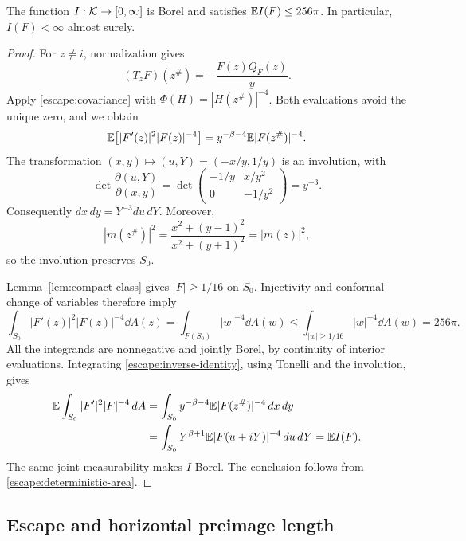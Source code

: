 \begin{lemma}
\label{lem:weighted-inverse-area}
The function $I:\mathcal K\to[0,\infty]$ is Borel and satisfies
$\mathbb E I(F)\le256\pi$.  In particular, $I(F)<\infty$ almost surely.
\end{lemma}
\begin{proof}
For $z\ne i$, normalization gives
\[
 (T_zF)(z^\#)=-\frac{F(z)Q_F(z)}y.
\]
Apply \eqref{escape:covariance} with
$\Phi(H)=|H(z^\#)|^{-4}$.  Both evaluations avoid the unique zero, and
we obtain
\begin{equation}
 \mathbb E\!\left[|F'(z)|^2|F(z)|^{-4}\right]
       =y^{-\beta-4}\mathbb E|F(z^\#)|^{-4}.
 \label{escape:inverse-identity}
\end{equation}
The transformation $(x,y)\mapsto(u,Y)=(-x/y,1/y)$ is an involution, with
\[
 \det\frac{\partial(u,Y)}{\partial(x,y)}
 =\det\begin{pmatrix}-1/y&x/y^2\\0&-1/y^2\end{pmatrix}
 =y^{-3}.
\]
Consequently $dx\,dy=Y^{-3}du\,dY$.  Moreover,
\[
 |m(z^\#)|^2
 =\frac{x^2+(y-1)^2}{x^2+(y+1)^2}=|m(z)|^2,
\]
so the involution preserves $S_0$.

Lemma~\ref{lem:compact-class} gives $|F|\ge1/16$ on $S_0$.
Injectivity and conformal change of variables therefore imply
\begin{equation}
 \int_{S_0}|F'(z)|^2|F(z)|^{-4}\dd A(z)
 =\int_{F(S_0)}|w|^{-4}\dd A(w)
 \le\int_{|w|\ge1/16}|w|^{-4}\dd A(w)=256\pi.
 \label{escape:deterministic-area}
\end{equation}
All the integrands are nonnegative and jointly Borel, by continuity of
interior evaluations.  Integrating \eqref{escape:inverse-identity},
using Tonelli and the involution, gives
\[
 \begin{split}
 \mathbb E\int_{S_0}|F'|^2|F|^{-4}\,d A
 &=\int_{S_0}y^{-\beta-4}\mathbb E|F(z^\#)|^{-4}\,dx\,dy\\
 &=\int_{S_0}Y^{\beta+1}\mathbb E|F(u+iY)|^{-4}\,du\,dY
 =\mathbb E I(F).
 \end{split}
\]
The same joint measurability makes $I$ Borel.  The conclusion follows
from \eqref{escape:deterministic-area}.
\end{proof}

\subsection{Escape and horizontal preimage length}

